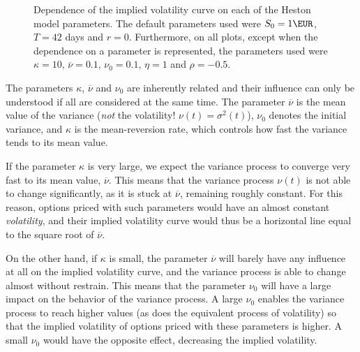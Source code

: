 \begin{figure}[H]
  \begin{subfigmatrix}{2}
  \end{subfigmatrix}
  \caption[Dependence of the implied volatility curve on each of the Heston model parameters.]{Dependence of the implied volatility curve on each of the Heston model parameters. The default parameters used were $S_0=1\EUR$, $T=42$ days and $r=0$. Furthermore, on all plots, except when the dependence on a parameter is represented, the parameters used were $\kappa=10$, $\overline{\nu}=0.1$, $\nu_0=0.1$, $\eta=1$ and $\rho=-0.5$.}
  \label{fig:Hparam}
\end{figure}

The parameters $\kappa$, $\overline{\nu}$ and $\nu_0$ are inherently related and their influence can only be understood if all are considered at the same time. The parameter $\overline{\nu}$ is the mean value of the variance (\emph{not} the volatility! $\nu(t)=\sigma^2(t)$), $\nu_0$ denotes the initial variance, and $\kappa$ is the mean-reversion rate, which controls how fast the variance tends to its mean value.

If the parameter $\kappa$ is very large, we expect the variance process to converge very fast to its mean value, $\overline{\nu}$. This means that the variance process $\nu(t)$ is not able to change significantly, as it is stuck at $\overline{\nu}$, remaining roughly constant. For this reason, options priced with such parameters would have an almost constant \emph{volatility}, and their implied volatility curve would thus be a horizontal line equal to the square root of $\overline{\nu}$.

On the other hand, if $\kappa$ is small, the parameter $\overline{\nu}$ will barely have any influence at all on the implied volatility curve, and the variance process is able to change almost without restrain. This means that the parameter $\nu_0$ will have a large impact on the behavior of the variance process. A large $\nu_0$ enables the variance process to reach higher values (as does the equivalent process of volatility) so that the implied volatility of options priced with these parameters is higher. A small $\nu_0$ would have the opposite effect, decreasing the implied volatility.

